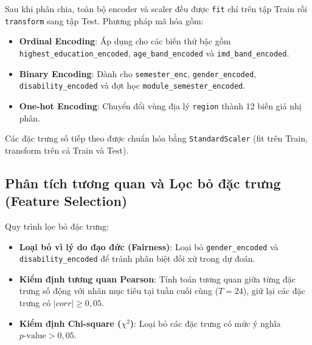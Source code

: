 Sau khi phân chia, toàn bộ encoder và scaler đều được \texttt{fit} chỉ trên tập Train rồi \texttt{transform} sang tập Test. Phương pháp mã hóa gồm:
\begin{itemize}[noitemsep,topsep=0pt]
    \item \textbf{Ordinal Encoding}: Áp dụng cho các biến thứ bậc gồm \texttt{highest\_}\allowbreak\texttt{education\_}\allowbreak\texttt{encoded}, \texttt{age\_}\allowbreak\texttt{band\_}\allowbreak\texttt{encoded} và \texttt{imd\_}\allowbreak\texttt{band\_}\allowbreak\texttt{encoded}.
    \item \textbf{Binary Encoding}: Dành cho \texttt{semester\_}\allowbreak\texttt{enc}, \texttt{gender\_}\allowbreak\texttt{encoded}, \texttt{disability\_}\allowbreak\texttt{encoded} và đợt học \texttt{module\_}\allowbreak\texttt{semester\_}\allowbreak\texttt{encoded}.
    \item \textbf{One-hot Encoding}: Chuyển đổi vùng địa lý \texttt{region} thành 12 biến giả nhị phân.
\end{itemize}

Các đặc trưng số tiếp theo được chuẩn hóa bằng \texttt{StandardScaler} (fit trên Train, transform trên cả Train và Test).

\subsection{Phân tích tương quan và Lọc bỏ đặc trưng (Feature Selection)}

Quy trình lọc bỏ đặc trưng:

\begin{itemize}[noitemsep,topsep=0pt]
    \item \textbf{Loại bỏ vì lý do đạo đức (Fairness)}: Loại bỏ 
    \texttt{gender\_}\allowbreak\texttt{encoded} và 
    \texttt{disability\_}\allowbreak\texttt{encoded} để tránh 
    phân biệt đối xử trong dự đoán.
    \item \textbf{Kiểm định tương quan Pearson}: Tính toán tương quan giữa từng đặc trưng số động với nhãn mục tiêu tại tuần cuối cùng ($T = 24$), giữ lại các đặc trưng có $|corr| \ge 0{,}05$.
    \item \textbf{Kiểm định Chi-square ($\chi^2$)}: Loại bỏ các đặc trưng có mức ý nghĩa $p\text{-value} > 0{,}05$.
\end{itemize}

